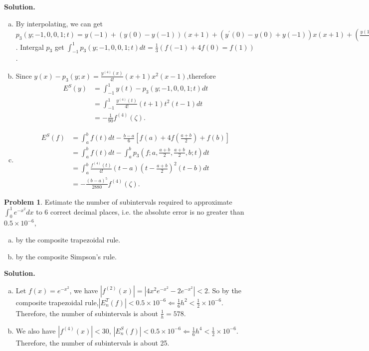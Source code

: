 \documentclass[a4paper]{book}
\newenvironment{solution}%
{\noindent\textbf{Solution.}}%
{\qedhere}
\numberwithin{equation}{chapter}
\theoremstyle{definition}
\newtheorem{pro}[exm]{Problem}
\begin{document}
\begin{solution}
  \begin{enumerate}[(a)]
  \item By interpolating, we can get $p_3(y; -1,0,0,1;t) = y(-1) + (y(0) - y(-1))(x+1) + (y^\prime(0) - y(0) + y(-1))x(x+1) + (\frac{y(1) - y(-1) - 2y^\prime(0)}{2})x^2(x+1)$.
    Intergal $p_3$ get $\int_{-1}^1p_3(y;-1,0,0,1;t)dt = \frac{1}{3}(f(-1) + 4f(0) = f(1))$.

  \item Since $y(x) - p_3(y;x) = \frac{y^{(4)}(x)}{4!}(x+1)x^2(x-1)$,therefore
    \begin{align*}
      E^S(y) &= \int_{-1}^1y(t) - p_3(y;-1,0,0,1;t) dt \\
             &= \int_{-1}^1  \frac{y^{(4)}(t)}{4!}(t+1)t^2(t-1) dt \\
      &= -\frac{1}{90}f^{(4)}(\zeta).
    \end{align*}

  \item
    \begin{align*}
      E^S(f) &= \int_{a}^b f(t)dt - \frac{b - a}{6}\left[ f(a) + 4 f(\frac{a + b}{2}) + f(b) \right] \\
             &= \int_a^b f(t) dt - \int_a^b p_3(f;a,\frac{a+b}{2}, \frac{a+b}{2}, b;t)dt \\
             &= \int_a^b  \frac{f^{(4)}(t)}{4!}(t-a)(t - \frac{a+b}{2})^2(t-b) dt\\
      &= - \frac{(b-a)^5}{2880}f^{(4)}(\zeta).
    \end{align*}
  \end{enumerate}
\end{solution}

\begin{pro}
  Estimate the number of subintervals required to approximate $\int_0^1 e^{-x^2}dx$ to 6 correct decimal places, i.e. the absolute error is no greater than $0.5 \times 10^{-6}$,
  \begin{enumerate}[(a)]
  \item by the composite trapezoidal rule.
    \item by the composite Simpson's rule.
  \end{enumerate}
\end{pro}

\begin{solution}
  \begin{enumerate}[(a)]
  \item Let $f(x) = e^{-x^2}$, we have $\left|f^{(2)}(x) \right| = \left|  4x^2 e^{-x^2} - 2e^{-x^2}\right| < 2 $. So by the composite trapezoidal rule,$\left| E^T_n(f) \right| < 0.5 \times 10^{-6} \Longleftarrow \frac{1}{6} h^2 < \frac{1}{2} \times 10^{-6} $. Therefore, the number of subintervals is about $\frac{1}{h} = 578$.

    \item We also have $\left| f^{(4)}(x) \right| < 30$, $\left| E^S_n(f) \right| < 0.5 \times 10^{-6} \Longleftarrow \frac{1}{6} h^4 < \frac{1}{2}\times 10^{-6}$. Therefore, the number of subintervals is about 25.
  \end{enumerate}
\end{solution}
\end{document}
